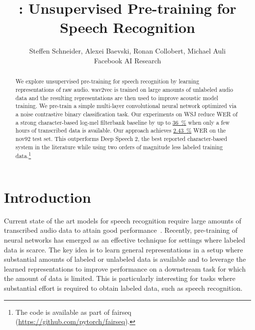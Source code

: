 \documentclass{article} \pdfoutput=1
\title{\wav: Unsupervised Pre-training for \\Speech Recognition}
\author{Steffen Schneider, Alexei Baevski, Ronan Collobert, Michael Auli \\
Facebook AI Research \\
}
\newcommand{\fullwsjresult}{\hyperref[tbl:wsj-results]{{\SI{2.43}{\percent}}}}
\newcommand{\lowresourceresult}{\hyperref[fig:low-resource]{{\SI{36}{\percent}}}}
\begin{document}
\maketitle

\begin{abstract}
We explore unsupervised pre-training for speech recognition by learning representations of raw audio.
wav2vec is trained on large amounts of unlabeled audio data and the resulting representations are then used to improve acoustic model training.
We pre-train a simple multi-layer convolutional neural network optimized via a noise contrastive binary classification task.
Our experiments on WSJ reduce WER of a strong character-based log-mel filterbank baseline by up to \lowresourceresult{} when only a few hours of transcribed data is available.
Our approach achieves \fullwsjresult{} WER on the nov92 test set. 
This outperforms Deep Speech 2, the best reported character-based system in the literature while using two orders of magnitude less labeled training data.\footnote{The code is available as part of fairseq (\url{https://github.com/pytorch/fairseq}).}
\end{abstract}

\section{Introduction}

Current state of the art models for speech recognition require large amounts of transcribed audio data to attain good performance~\citep{amodei2016deepspeech}.
Recently, pre-training of neural networks has emerged as an effective technique for settings where labeled data is scarce.
The key idea is to learn general representations in a setup where substantial amounts of labeled or unlabeled data is available and to leverage the learned representations to improve performance on a downstream task for which the amount of data is limited.
This is particularly interesting for tasks where substantial effort is required to obtain labeled data, such as speech recognition.
\end{document}
